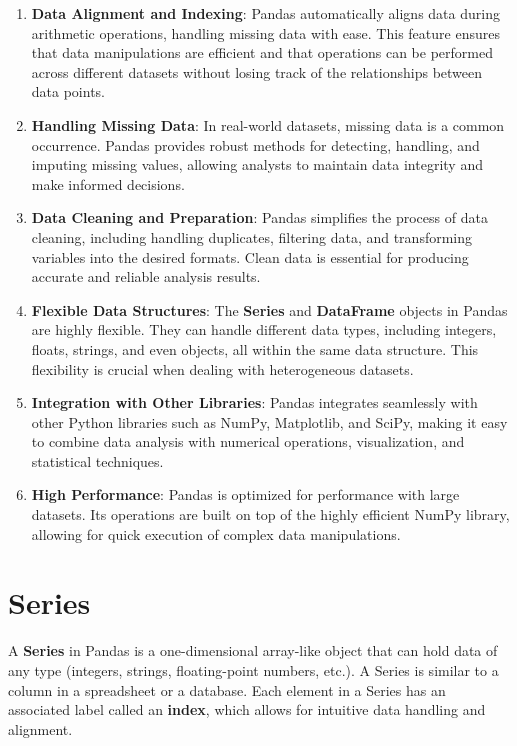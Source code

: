 \documentclass[
  letterpaper,
  DIV=11,
  numbers=noendperiod]{scrreprt}
\begin{document}
\begin{enumerate}
\def\labelenumi{\arabic{enumi}.}
\item
  \textbf{Data Alignment and Indexing}: Pandas automatically aligns data
  during arithmetic operations, handling missing data with ease. This
  feature ensures that data manipulations are efficient and that
  operations can be performed across different datasets without losing
  track of the relationships between data points.
\item
  \textbf{Handling Missing Data}: In real-world datasets, missing data
  is a common occurrence. Pandas provides robust methods for detecting,
  handling, and imputing missing values, allowing analysts to maintain
  data integrity and make informed decisions.
\item
  \textbf{Data Cleaning and Preparation}: Pandas simplifies the process
  of data cleaning, including handling duplicates, filtering data, and
  transforming variables into the desired formats. Clean data is
  essential for producing accurate and reliable analysis results.
\item
  \textbf{Flexible Data Structures}: The \textbf{Series} and
  \textbf{DataFrame} objects in Pandas are highly flexible. They can
  handle different data types, including integers, floats, strings, and
  even objects, all within the same data structure. This flexibility is
  crucial when dealing with heterogeneous datasets.
\item
  \textbf{Integration with Other Libraries}: Pandas integrates
  seamlessly with other Python libraries such as NumPy, Matplotlib, and
  SciPy, making it easy to combine data analysis with numerical
  operations, visualization, and statistical techniques.
\item
  \textbf{High Performance}: Pandas is optimized for performance with
  large datasets. Its operations are built on top of the highly
  efficient NumPy library, allowing for quick execution of complex data
  manipulations.
\end{enumerate}

\hypertarget{series}{%
\section{Series}\label{series}}

A \textbf{Series} in Pandas is a one-dimensional array-like object that
can hold data of any type (integers, strings, floating-point numbers,
etc.). A Series is similar to a column in a spreadsheet or a database.
Each element in a Series has an associated label called an
\textbf{index}, which allows for intuitive data handling and alignment.
\end{document}
